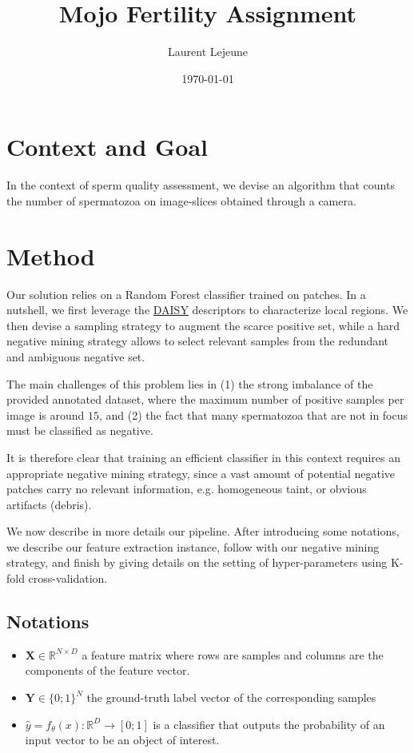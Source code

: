 \documentclass[11pt]{article}
\author{Laurent Lejeune}
\date{\today}
\title{Mojo Fertility Assignment}
\begin{document}
\maketitle

\section{Context and Goal}
\label{sec:org81fc0ee}

In the context of sperm quality assessment, we devise an algorithm that counts the number of spermatozoa
on image-slices obtained through a camera.


\section{Method}
\label{sec:org471f105}

Our solution relies on a Random Forest classifier trained on patches.
In a nutshell, we first leverage the \href{https://www.epfl.ch/labs/cvlab/software/descriptors-and-keypoints/daisy/}{DAISY} descriptors to characterize local regions.
We then devise a sampling strategy to augment the scarce positive set, while a hard negative mining strategy allows to select relevant samples from the redundant and ambiguous
negative set.

The main challenges of this problem lies in (1) the strong imbalance of the provided annotated dataset, where the maximum number of positive samples per image is around \(15\), and (2) the fact that many spermatozoa that are not
in focus must be classified as negative.

It is therefore clear that training an efficient classifier in this context requires an appropriate
negative mining strategy, since a vast amount of potential negative patches carry no relevant information, e.g.
homogeneous taint, or obvious artifacts (debris).

We now describe in more details our pipeline.
After introducing some notations, we describe our feature extraction instance, follow with
our negative mining strategy, and finish by giving details on the setting of hyper-parameters using K-fold cross-validation.


\subsection{Notations}
\label{sec:org8d247f5}

\begin{itemize}
\item \(\bm{X} \in \mathbb{R}^{N \times D}\) a feature matrix where rows are samples and columns
are the components of the feature vector.
\item \(\bm{Y} \in \{0;1\}^N\) the ground-truth label vector of the corresponding samples
\item \(\hat{y}= f_{\theta}(x): \mathbb{R}^{D} \rightarrow [0;1]\) is a classifier that outputs the probability of an input vector to be an object of interest.
\end{itemize}
\end{document}
